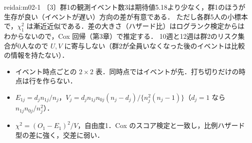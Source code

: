 \begin{kaitou}{reidai:m02-1}
〔3〕群1の観測イベント数3は期待値5.18より少なく，群1のほうが生存が良い（イベントが遅い）方向の差が有意である．
ただし各群5人の小標本で，$\chi^2_1$ は漸近近似である．差の大きさ（ハザード比）はログランク検定からはわからないので，Cox 回帰（第3章）で推定する．
10週と12週は群2のリスク集合が0人なので $U,V$ に寄与しない（群2が全員いなくなった後のイベントは比較の情報を持たない）．
\end{kaitou}

\begin{summarybox}
\begin{itemize}
\item イベント時点ごとの $2\times2$ 表．同時点ではイベントが先．打ち切りだけの時点は行を作らない．
\item $E_{1j}=d_jn_{1j}/n_j$，$V_j=d_jn_{1j}n_{0j}(n_j-d_j)/\{n_j^2(n_j-1)\}$（$d_j=1$ なら $n_{1j}n_{0j}/n_j^2$）．
\item $\chi^2=(O_1-E_1)^2/V$，自由度1．Cox のスコア検定と一致し，比例ハザード型の差に強く，交差に弱い．
\end{itemize}
\end{summarybox}
